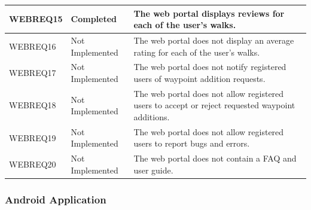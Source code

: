 \documentclass[11pt,a4paper]{article}
\begin{document}
\begin{longtable}{ p{}|p{}|p{} }
WEBREQ15 & Completed & The web portal displays reviews for each of the user's walks. \\ \hline
WEBREQ16 & Not Implemented & The web portal does not display an average rating for each of the user's walks. \\ \hline
WEBREQ17 & Not Implemented & The web portal does not notify registered users of waypoint addition requests. \\ \hline
WEBREQ18 & Not Implemented & The web portal does not allow registered users to accept or reject requested waypoint additions. \\ \hline
WEBREQ19 & Not Implemented & The web portal does not allow registered users to report bugs and errors. \\ \hline
WEBREQ20 & Not Implemented & The web portal does not contain a FAQ and user guide. \\
\end{longtable}

\subsubsection{Android Application}
\label{sec:app-reqs}
\end{document}
